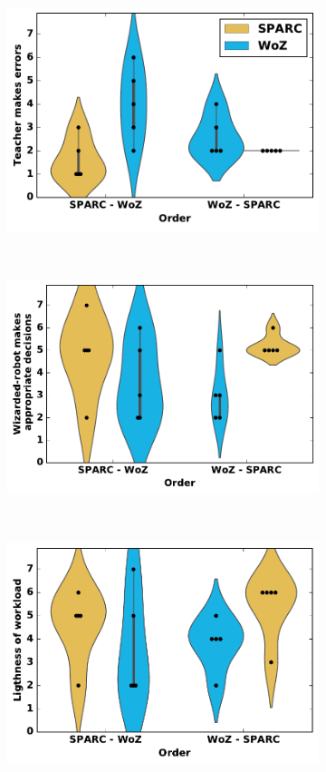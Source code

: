 \begin{figure}[ht]
	\centering
	\begin{subfigure}[t]{0.3295\textwidth}
		\centering
		\includegraphics[width=1.\textwidth]{./images/woz_errors.pdf}
	\end{subfigure}%
	~ 
	\begin{subfigure}[t]{0.341\textwidth}
		\centering
		\includegraphics[width=1.\textwidth]{./images/woz_appropriate.pdf}
	\end{subfigure}%
	~ 
	\begin{subfigure}[t]{0.3295\textwidth}
		\centering
		\includegraphics[width=1.\textwidth]{./images/woz_workload.pdf}

\end{subfigure}
\end{figure}
